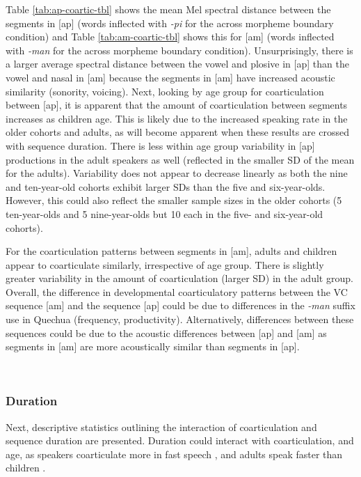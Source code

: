 \documentclass[a4paper,man,floatsintext,natbib,donotrepeattitle, apacite]{apa6}
\begin{document}
Table \ref{tab:ap-coartic-tbl} shows the mean Mel spectral distance between the segments in {[}ap{]} (words inflected with \emph{-pi} for the across morpheme boundary condition) and Table \ref{tab:am-coartic-tbl} shows this for {[}am{]} (words inflected with \emph{-man} for the across morpheme boundary condition). Unsurprisingly, there is a larger average spectral distance between the vowel and plosive in {[}ap{]} than the vowel and nasal in {[}am{]} because the segments in {[}am{]} have increased acoustic similarity (sonority, voicing). Next, looking by age group for coarticulation between {[}ap{]}, it is apparent that the amount of coarticulation between segments increases as children age. This is likely due to the increased speaking rate in the older cohorts and adults, as will become apparent when these results are crossed with sequence duration. There is less within age group variability in {[}ap{]} productions in the adult speakers as well (reflected in the smaller SD of the mean for the adults). Variability does not appear to decrease linearly as both the nine and ten-year-old cohorts exhibit larger SDs than the five and six-year-olds. However, this could also reflect the smaller sample sizes in the older cohorts (5 ten-year-olds and 5 nine-year-olds but 10 each in the five- and six-year-old cohorts).

For the coarticulation patterns between segments in {[}am{]}, adults and children appear to coarticulate similarly, irrespective of age group. There is slightly greater variability in the amount of coarticulation (larger SD) in the adult group. Overall, the difference in developmental coarticulatory patterns between the VC sequence {[}am{]} and the sequence {[}ap{]} could be due to differences in the \emph{-man} suffix use in Quechua (frequency, productivity). Alternatively, differences between these sequences could be due to the acoustic differences between {[}ap{]} and {[}am{]} as segments in {[}am{]} are more acoustically similar than segments in {[}ap{]}.

~
~

\subsubsection{Duration}\label{duration}

Next, descriptive statistics outlining the interaction of coarticulation and sequence duration are presented. Duration could interact with coarticulation, and age, as speakers coarticulate more in fast speech \citep{gayMechanismsControlSpeech1981}, and adults speak faster than children \citep{leeAcousticsChildrenSpeech1999}.
\end{document}
